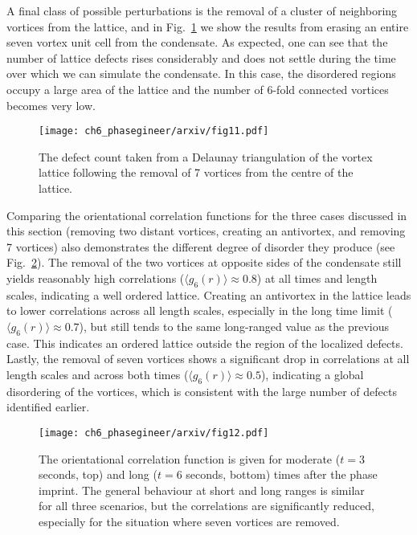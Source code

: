 A final class of possible perturbations is the removal of a cluster of neighboring vortices from the lattice, and in Fig.~\ref{fig:remove7_defect} we show the results from erasing an entire seven vortex unit cell from the condensate. As expected, one can see that the number of lattice defects rises considerably and does not settle during the time over which we can simulate the condensate. In this case, the disordered regions occupy a large area of the lattice and the number of 6-fold connected vortices becomes very low.

\begin{figure}[h!]\centering
    \texttt{[image: ch6\_phasegineer/arxiv/fig11.pdf]}
    \caption{The defect count taken from a Delaunay triangulation of the vortex lattice following the removal of 7 vortices from the centre of the lattice. }\label{fig:remove7_defect}
\end{figure}

Comparing the orientational correlation functions for the three cases discussed in this section (removing two distant vortices, creating an antivortex, and removing 7 vortices) also demonstrates the different degree of disorder they produce (see Fig.~\ref{fig:g6_2edge_anti_nuclear}). The removal of the two vortices at opposite sides of the condensate still yields reasonably high correlations ($\langle g_6(r) \rangle \approx 0.8$) at all times and length scales, indicating a well ordered lattice. Creating an antivortex in the lattice leads to lower correlations across all length scales, especially in the long time limit ($\langle g_6(r) \rangle\approx 0.7$), but still tends to the same long-ranged value as the previous case. This indicates an ordered lattice outside the region of the localized defects. Lastly, the removal of seven vortices shows a significant drop in correlations at all length scales and across both times ($\langle g_6(r) \rangle\approx 0.5$), indicating a global disordering of the vortices, which is consistent with the large number of defects identified earlier.

\begin{figure}[h!]\centering
    \texttt{[image: ch6\_phasegineer/arxiv/fig12.pdf]}
    \caption{The orientational correlation function is given for moderate ($t=3$ seconds, top) and long ($t=6$ seconds, bottom) times after the phase imprint. The general behaviour at short and long ranges is similar for all three scenarios, but the correlations are significantly reduced, especially for the situation where seven vortices are removed.}\label{fig:g6_2edge_anti_nuclear}
\end{figure}
